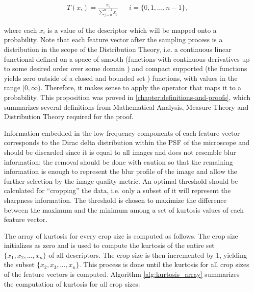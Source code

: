 \begin{align}
\label{eqn:probability_operator}
T(x_{i}) = \frac{x_{i}}{\sum_{j=0}^{n-1}x_{j}}
&&  i = \{0,1,...,n-1\},
\end{align}

\noindent where each $x_{i}$ is a value of the descriptor which will be mapped onto a probability. Note that each feature vector after the sampling process is a distribution in the scope of the Distribution Theory, i.e. a continuous linear functional defined on a space of smooth (functions with continuous derivatives up to some desired order over some domain \cite{weisstein2020smooth}) and compact supported (the functions yields zero outside of a closed and bounded set \cite{weisstein2020compact}) functions, with values in the range $[0,\infty)$. Therefore, it makes sense to apply the operator that maps it to a probability. This proposition was proved in \autoref{chapter:definitions-and-proofs}, which summarizes several definitions from Mathematical Analysis, Measure Theory and Distribution Theory required for the proof.

Information embedded in the low-frequency components of each feature vector corresponds to the Dirac delta distribution within the PSF of the microscope and should be discarded since it is equal to all images and does not resemble blur information; the removal should be done with caution so that the remaining information is enough to represent the blur profile of the image and allow the further selection by the image quality metric. An optimal threshold should be calculated for ``cropping'' the data, i.e. only a subset of it will represent the sharpness information. The threshold is chosen to maximize the difference between the maximum and the minimum among a set of kurtosis values of each feature vector.

The array of kurtosis for every crop size is computed as follows. The crop size initializes as zero and is used to compute the kurtosis of the entire set $\{x_{1},x_{2},...,x_{n}\}$ of all descriptors. The crop size is then incremented by 1, yielding the subset $\{x_{2},x_{3},...,x_{n}\}$. This process is done until the kurtosis for all crop sizes of the feature vectors is computed. Algorithm \ref{alg:kurtosis_array} summarizes the computation of kurtosis for all crop sizes:

